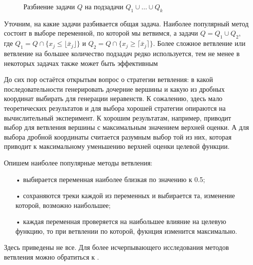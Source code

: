 \documentclass[a4paper,14pt,russian]{extreport}
\begin{document}
\par
\begin{figure}[h]
\caption{Разбиение задачи $Q$ на подзадачи $Q_1 \cup \dots \cup Q_k$}
\label{ris:branching}
\end{figure}
\par
Уточним, на какие задачи разбивается общая задача. Наиболее популярный метод состоит в выборе переменной, по которой мы ветвимся, а задачи $Q = Q_1 \cup Q_2$, где $Q_1 = Q \cap \{x_j \le \lfloor \bar x_j \rfloor \}$ и $Q_2 = Q \cap \{x_j \ge \lceil \bar x_j \rceil \}$. Более сложное ветвление или ветвление на большее количество подзадач редко используется, тем не менее в некоторых задачах также может быть эффективным \cite{borndoerfer} \cite{clochard} \cite{naddef}
\par
До сих пор остаётся открытым вопрос о стратегии ветвления: в какой последовательности генерировать дочерние вершины и какую из дробных координат выбирать для генерации неравенств. К сожалению, здесь мало теоретических результатов и для выбора хорошей стратегии опираются на вычислительный эксперимент. К хорошим результатам, например, приводит выбор для ветвления вершины с максимальным значением верхней оценки. А для выбора дробной координаты считается разумным выбор той из них, которая приводит к максимальному уменьшению верхней оценки целевой функции. 
\par
Опишем наиболее популярные методы ветвления:
\begin{itemize}
\item[•] выбирается переменная наиболее близкая по значению к 0.5;
\item[•] сохраняются треки каждой из переменных и выбирается та, изменение которой, возможно наибольшее;
\item[•] каждая переменная проверяется на наибольшее влияние на целевую функцию, то при ветвлении по которой, фукнция изменится максимально.
\end{itemize}
\par
Здесь приведены не все. Для более исчерпывающего исследования методов ветвления можно обратиться к \cite{land_powell} \cite{linderoth} \cite{fuegenschuh}.
\end{document}
